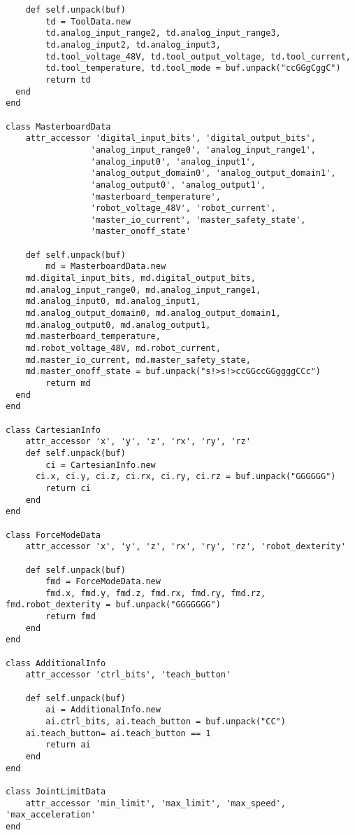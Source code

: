 \documentclass[
a4paper,
12pt,
oneside,
headsepline,		%
footsepline,		%
]{scrbook}
\begin{document}
\begin{lstlisting}
    def self.unpack(buf)
        td = ToolData.new
        td.analog_input_range2, td.analog_input_range3,
        td.analog_input2, td.analog_input3,
        td.tool_voltage_48V, td.tool_output_voltage, td.tool_current,
        td.tool_temperature, td.tool_mode = buf.unpack("ccGGgCggC")
        return td
  end
end

class MasterboardData
    attr_accessor 'digital_input_bits', 'digital_output_bits',
                 'analog_input_range0', 'analog_input_range1',
                 'analog_input0', 'analog_input1',
                 'analog_output_domain0', 'analog_output_domain1',
                 'analog_output0', 'analog_output1',
                 'masterboard_temperature',
                 'robot_voltage_48V', 'robot_current',
                 'master_io_current', 'master_safety_state',
                 'master_onoff_state'
    
    def self.unpack(buf)
        md = MasterboardData.new
    md.digital_input_bits, md.digital_output_bits,
    md.analog_input_range0, md.analog_input_range1,
    md.analog_input0, md.analog_input1,
    md.analog_output_domain0, md.analog_output_domain1,
    md.analog_output0, md.analog_output1,
    md.masterboard_temperature,
    md.robot_voltage_48V, md.robot_current,
    md.master_io_current, md.master_safety_state,
    md.master_onoff_state = buf.unpack("s!>s!>ccGGccGGggggCCc")
        return md
  end 
end

class CartesianInfo
    attr_accessor 'x', 'y', 'z', 'rx', 'ry', 'rz'
    def self.unpack(buf)
        ci = CartesianInfo.new
      ci.x, ci.y, ci.z, ci.rx, ci.ry, ci.rz = buf.unpack("GGGGGG")
        return ci
    end
end

class ForceModeData
    attr_accessor 'x', 'y', 'z', 'rx', 'ry', 'rz', 'robot_dexterity'
    
    def self.unpack(buf)
        fmd = ForceModeData.new
        fmd.x, fmd.y, fmd.z, fmd.rx, fmd.ry, fmd.rz, fmd.robot_dexterity = buf.unpack("GGGGGGG")
        return fmd
    end
end

class AdditionalInfo
    attr_accessor 'ctrl_bits', 'teach_button'
    
    def self.unpack(buf)
        ai = AdditionalInfo.new
        ai.ctrl_bits, ai.teach_button = buf.unpack("CC")
    ai.teach_button= ai.teach_button == 1
        return ai
    end
end

class JointLimitData
    attr_accessor 'min_limit', 'max_limit', 'max_speed', 'max_acceleration'
end


\end{lstlisting}
\end{document}
